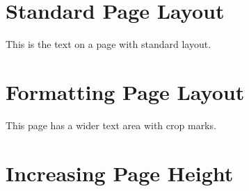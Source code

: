 \documentclass{article}
\begin{document}
\section{Standard Page Layout}
This is the text on a page with standard layout.

\section{Formatting Page Layout}
This page has a wider text area with crop marks.

\section{Increasing Page Height}
\lipsum[1-10] %
\end{document}

